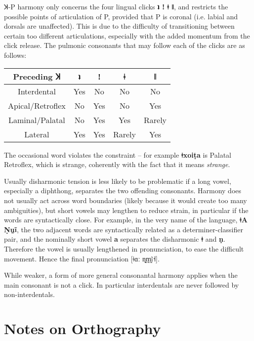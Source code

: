 \documentclass[11pt,a5paper]{book}
\newcommand{\qcn}[1]{\textcolor{AccentText}{\large\textbf{#1}}}
\newcommand{\langnamelong}{\qcn{ǂA Ṇṵĩ}}
\begin{document}
Ʞ-P harmony only concerns the four lingual clicks \qcn{ʇ ǃ ǂ ǁ}, and restricts the possible points of articulation of P, provided that P is coronal (i.e. labial and dorsals are unaffected). This is due to the difficulty of transitioning between certain too different articulations, especially with the added momentum from the click release. The pulmonic consonants that may follow each of the clicks are as follows:

\begin{center}
\begin{tabular}{|c|c|c|c|c|}
\hline
Preceding Ʞ & \qcn{ʇ} & \qcn{ǃ} & \qcn{ǂ} & \qcn{ǁ} \\ \hline \hline
Interdental & Yes & No & No & No \\\hline
Apical/Retroflex & No & Yes & No & Yes \\\hline
Laminal/Palatal & No & Yes & Yes & Rarely \\\hline
Lateral & Yes & Yes & Rarely & Yes \\ \hline
\end{tabular}
\end{center}

The occasional word violates the constraint -- for example \qcn{ǂxoiṭa} is Palatal \textrightarrow{} Retroflex, which is strange, coherently with the fact that it means \emph{strange}. 

Usually disharmonic tension is less likely to be problematic if a long vowel, especially a diphthong, separates the two offending consonants. Harmony does not usually act across word boundaries (likely because it would create too many ambiguities), but short vowels may lengthen to reduce strain, in particular if the words are syntactically close. For example, in the very name of the language, \langnamelong{}, the two adjacent words are syntactically related as a determiner-classifier pair, and the nominally short vowel \qcn{a} separates the disharmonic \qcn{ǂ} and \qcn{ṇ}. Therefore the vowel is usually lengthened in pronunciation, to ease the difficult movement. Hence the final pronunciation [ǂɑː ɳ̰m̩̰ḭ̃˧].

While weaker, a form of more general consonantal harmony applies when the main consonant is not a click. In particular interdentals are never followed by non-interdentals.

\section{Notes on Orthography}
\end{document}

